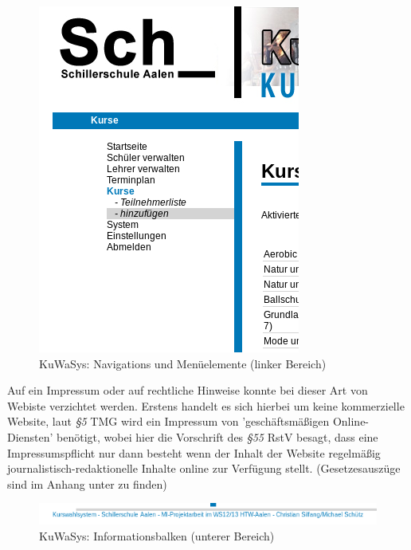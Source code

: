 \begin{figure}[H]
 \begin{center}
   \includegraphics[scale=0.65]{img/navigation_KuWaSys.png}
 \end{center}
 \caption[\textbf{KuWaSys: Navigations und Menüelemente (linker Bereich)}]{KuWaSys: Navigations und Menüelemente (linker Bereich)}
 \label{fig:navihervorhebung_KuWaSys}
\end{figure}

Auf ein Impressum oder auf rechtliche Hinweise konnte bei dieser Art von Webiste verzichtet werden. 
Erstens handelt es sich hierbei um keine kommerzielle Website, laut \textit{§5} \ac{TMG} wird ein Impressum von 'geschäftsmäßigen Online-Diensten' benötigt, wobei hier die Vorschrift des \textit{§55} \ac{RstV} besagt, dass eine Impressumspflicht nur dann besteht wenn der Inhalt der Website regelmäßig journalistisch-redaktionelle Inhalte online zur Verfügung stellt.
(Gesetzesauszüge sind im Anhang unter  zu finden) 

\begin{figure}[h]
 \begin{center}
   \includegraphics[scale=0.7]{img/footer_KuWaSys.png}
 \end{center}
 \caption[\textbf{KuWaSys: Informationsbalken (unterer Bereich)}]{KuWaSys: Informationsbalken (unterer Bereich)}
 \label{fig:footer_KuWaSys}
\end{figure}

